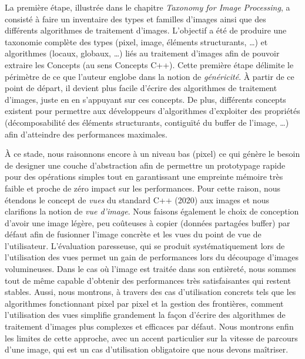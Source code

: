 La première étape, illustrée dans le chapitre \emph{Taxonomy for Image Processing}, a consisté à faire un inventaire des
types et familles d'images ainsi que des différents algorithmes de traitement d'images. L'objectif a été de produire une
taxonomie complète des types (pixel, image, éléments structurants, \ldots) et algorithmes (locaux, globaux, \ldots) liés
au traitement d'images afin de pouvoir extraire les Concepts (au sens Concepts C++). Cette première étape délimite le
périmètre de ce que l'auteur englobe dans la notion de \emph{généricité}. \`{A} partir de ce point de départ, il devient
plus facile d'écrire des algorithmes de traitement d'images, juste en en s'appuyant sur ces concepts. De plus,
différents concepts existent pour permettre aux développeurs d'algorithmes d'exploiter des propriétés (décomposabilité
des éléments structurants, contiguïté du buffer de l'image, \ldots) afin d'atteindre des performances maximales.

\`{A} ce stade, nous raisonnons encore à un niveau bas (pixel) ce qui génère le besoin de designer une couche
d'abstraction afin de permettre un prototypage rapide pour des opérations simples tout en garantissant une empreinte
mémoire très faible et proche de zéro impact sur les performances. Pour cette raison, nous étendons le concept de
\emph{vues} du standard C++ (2020) aux images et nous clarifions la notion de \emph{vue d'image}. Nous faisons également
le choix de conception d'avoir une image légère, peu coûteuses à copier (données partagées buffer) par défaut afin de
fusionner l'image concrète et les vues du point de vue de l'utilisateur. L'évaluation paresseuse, qui se produit
systématiquement lors de l'utilisation des vues permet un gain de performances lors du découpage d'images volumineuses.
Dans le cas où l'image est traitée dans son entièreté, nous sommes tout de même capable d'obtenir des performances très
satisfaisantes qui restent stables. Aussi, nous montrons, à travers des cas d'utilisation concrets tels que les
algorithmes fonctionnant pixel par pixel et la gestion des frontières, comment l'utilisation des vues simplifie
grandement la façon d'écrire des algorithmes de traitement d'images plus complexes et efficaces par défaut. Nous
montrons enfin les limites de cette approche, avec un accent particulier sur la vitesse de parcours d'une image, qui est
un cas d'utilisation obligatoire que nous devons maîtriser.


